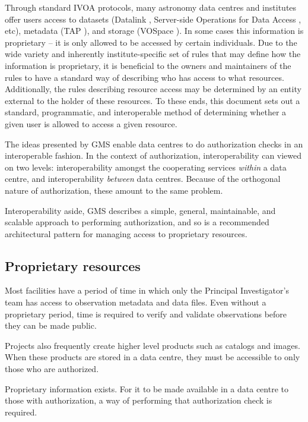 \documentclass[11pt,a4paper]{ivoa}
\begin{document}
Through standard IVOA protocols, many astronomy data centres and institutes offer users access to datasets (Datalink \citep{2015ivoa.spec.0617D}, Server-side Operations for Data Access \citep{2017ivoa.spec.0517B}, etc), metadata (TAP \citep{2010ivoa.spec.0327D}), and storage (VOSpace \citep{2018ivoa.spec.0621G}).  In some cases this information is proprietary -- it is only allowed to be accessed by certain individuals.  Due to the wide variety and inherently institute-specific set of rules that may define how the information is proprietary, it is beneficial to the owners and maintainers of the rules to have a standard way of describing who has access to what resources.  Additionally, the rules describing resource access may be determined by an entity external to the holder of these resources.  To these ends, this document sets out a standard, programmatic, and interoperable method of determining whether a given user is allowed to access a given resource.

The ideas presented by GMS enable data centres to do authorization checks in an interoperable fashion.  In the context of authorization, interoperability can viewed on two levels:  interoperability amongst the cooperating services \emph{within} a data centre, and interoperability \emph{between} data centres.  Because of the orthogonal nature of authorization, these amount to the same problem.

Interoperability aside, GMS describes a simple, general, maintainable, and scalable approach to performing authorization, and so is a recommended architectural pattern for managing access to proprietary resources.

\subsection{Proprietary resources}

Most facilities have a period of time in which only the Principal Investigator's team has access to observation metadata and data files.  Even without a proprietary period, time is required to verify and validate observations before they can be made public.

Projects also frequently create higher level products such as catalogs and images.  When these products are stored in a data centre, they must be accessible to only those who are authorized.

Proprietary information exists.  For it to be made available in a data centre to those with authorization, a way of performing that authorization check is required.
\end{document}
